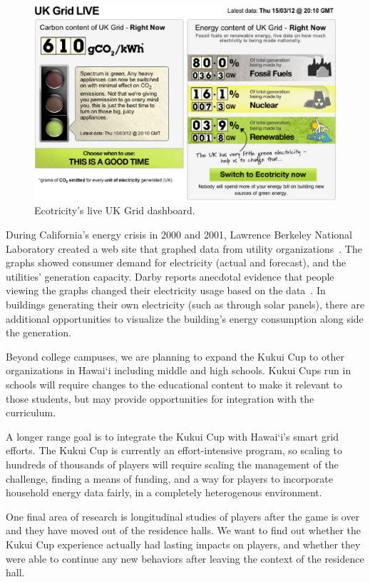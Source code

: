 \documentclass[10pt, conference, compsocconf]{IEEEtran-old}
\newcommand{\Hawaii}{Hawai`i\xspace}
\begin{document}
\begin{figure}[!tb]
	\centering
		\includegraphics[width=\columnwidth]{ecotricity-dashboard}
		\caption{Ecotricity's live UK Grid dashboard.}
		\label{fig:ecotricity-dashboard}
\end{figure}

During California's energy crisis in 2000 and 2001, Lawrence Berkeley National Laboratory created a web site that graphed data from utility organizations~\cite{Bartholomew2008Current-Energy}. The graphs showed consumer demand for electricity (actual and forecast), and the utilities' generation capacity. Darby reports anecdotal evidence that people viewing the graphs changed their electricity usage based on the data~\cite{darby-review-2006}. In buildings generating their own electricity (such as through solar panels), there are additional opportunities to visualize the building's energy consumption along side the generation.

Beyond college campuses, we are planning to expand the Kukui Cup to other organizations in \Hawaii including middle and high schools. Kukui Cups run in schools will require changes to the educational content to make it relevant to those students, but may provide opportunities for integration with the curriculum.

A longer range goal is to integrate the Kukui Cup with \Hawaii's smart grid efforts. The Kukui Cup is currently an effort-intensive program, so scaling to hundreds of thousands of players will require scaling the management of the challenge, finding a means of funding, and a way for players to incorporate household energy data fairly, in a completely heterogenous environment.

One final area of research is longitudinal studies of players after the game is over and they have moved out of the residence halls. We want to find out whether the Kukui Cup experience actually had lasting impacts on players, and whether they were able to continue any new behaviors after leaving the context of the residence hall.
\end{document}
